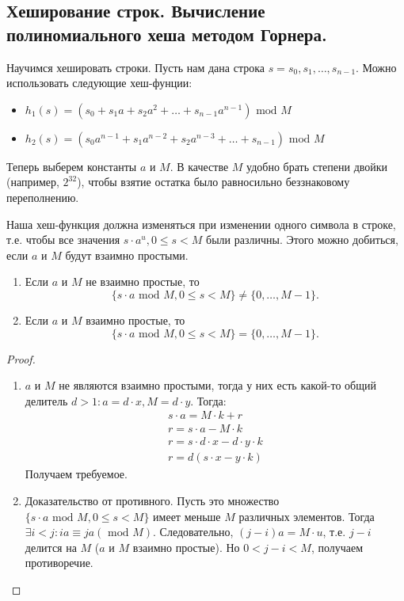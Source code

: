 \subsection{Хеширование строк. Вычисление полиномиального хеша методом Горнера.}
Научимся хешировать строки. Пусть нам дана строка $s = s_0, s_1, \ldots, s_{n-1}$.
Можно использовать следующие хеш-фунции:
\begin{itemize}
  \item $h_1(s) = (s_0 + s_1 a + s_2 a^2 + \ldots + s_{n-1} a^{n-1}) \textrm{ mod } M$
  \item $h_2(s) = (s_0 a^{n-1} + s_1 a^{n-2} + s_2 a^{n-3} + \ldots + s_{n-1}) \textrm{ mod } M$
\end{itemize}

Теперь выберем константы $a$ и $M$. В качестве $M$ удобно брать степени двойки (например, $2^{32}$), 
чтобы взятие остатка было равносильно беззнаковому переполнению.

Наша хеш-функция должна изменяться при изменении одного символа в строке, т.е. чтобы все значения
$s \cdot a^{u}, 0 \leq s < M$ были различны. Этого можно добиться, если $a$ и $M$ будут взаимно простыми.
\begin{theorem}[]
  \begin{enumerate}
    \item Если $a$ и $M$ не взаимно простые, то 
      \[
        \{ s \cdot a  \textrm{ mod } M, 0 \leq s < M \} \neq \{0, \ldots, M - 1\}
      .\] 
    \item Если $a$ и $M$ взаимно простые, то
      \[
        \{ s \cdot a \textrm{ mod } M, 0 \leq s < M \} = \{ 0, \ldots, M - 1 \}
      .\] 
  \end{enumerate}
\end{theorem}
\begin{proof}
   \begin{enumerate}
     \item $a$ и $M$ не являются взаимно простыми, тогда у них есть какой-то общий делитель 
       $d > 1 \colon a = d \cdot x, M = d \cdot y$. Тогда:
       \begin{gather*}
         s \cdot a = M \cdot k + r \\
         r = s \cdot a - M \cdot k \\
         r = s \cdot d \cdot x - d \cdot y \cdot k \\
         r = d(s \cdot x - y \cdot k) 
       \end{gather*}
       Получаем требуемое.
     \item Доказательство от противного. Пусть это множество $\{ s \cdot a \textrm{ mod } M, 0 \leq s < M \}$
       имеет меньше $M$ различных элементов. Тогда $\exists i < j \colon ia \equiv ja (\textrm{ mod } M)$.
       Следовательно, $(j - i)a = M \cdot u$, т.е.  $j - i$ делится на  $M$ ($a$ и $M$ взаимно простые).
       Но $0 < j - i < M$, получаем противоречие.
   \end{enumerate}
\end{proof}

